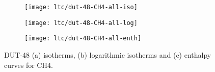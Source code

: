 \begin{figure}[htb]
    \centering
    \begin{subfigure}{0.33\linewidth}
        \texttt{[image: ltc/dut-48-CH4-all-iso]}%
        \caption{}
    \end{subfigure}%
    \begin{subfigure}{0.33\linewidth}
        \texttt{[image: ltc/dut-48-CH4-all-log]}%
        \caption{}
    \end{subfigure}%
    \begin{subfigure}{0.33\linewidth}
        \texttt{[image: ltc/dut-48-CH4-all-enth]}%
        \caption{}
    \end{subfigure}%
    \caption{DUT-48 (a) isotherms, (b) logarithmic isotherms and 
    (c) enthalpy curves for CH4.}%
    \label{appx:dut:fig:dut-48-CH4-ltc}
\end{figure}

\pagebreak